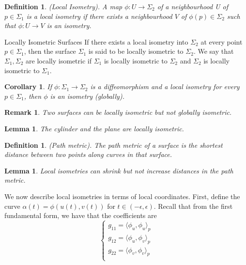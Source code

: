 \documentclass[twoside]{article}
\newtheorem{lemma}[theorem]{Lemma}
\newtheorem{corollary}[theorem]{Corollary}
\newtheorem{definition}[theorem]{Definition}
\newtheorem{remark}[theorem]{Remark}
\begin{document}
\begin{definition}(Local Isometry). A map $\phi: U \rightarrow \Sigma_2$ of a neighbourhood U of $p \in \Sigma_1$ is a local isometry if there exists a neighbourhood $V$ of $\phi(p) \in \Sigma_2$ such that $\phi: U \rightarrow V$ is an isometry. 
\end{definition}

\begin{definition_exam}{Locally Isometric Surfaces}{} If there exists a local isometry into $\Sigma_2$ at every point $p \in \Sigma_1$, then the surface $\Sigma_1$ is said to be locally isometric to $\Sigma_2.$ We say that $\Sigma_1, \Sigma_2$ are locally isometric if $\Sigma_1$ is locally isometric to $\Sigma_2$ and $\Sigma_2$ is locally isometric to $\Sigma_1.$
\end{definition_exam}

\begin{corollary}If $\phi: \Sigma_1 \rightarrow \Sigma_2$ is a diffeomorphism and a local isometry for every $p \in \Sigma_1$, then $\phi$ is an isometry (globally).
\end{corollary}

\begin{remark}Two surfaces can be locally isometric but not globally isometric.
\end{remark}

\begin{lemma}The cylinder and the plane are locally isometric.
\end{lemma}

\begin{definition}(Path metric). The path metric of a surface is the shortest distance between two points along curves in that surface.
\end{definition}

\begin{lemma}Local isometries can shrink but not increase distances in the path metric.
\end{lemma}

We now describe local isometries in terms of local coordinates. First, define the curve $\alpha(t) = \phi(u(t), v(t))$ for $t \in (-\epsilon, \epsilon)$. Recall that from the first fundamental form, we have that the coefficients are
$$
\begin{cases}
g_{11} = \langle \phi_u, \phi_u\rangle_p\\
g_{12} = \langle \phi_u, \phi_v \rangle_p\\
g_{22} = \langle \phi_v, \phi_v \rangle_p\\
\end{cases}
$$
\end{document}
